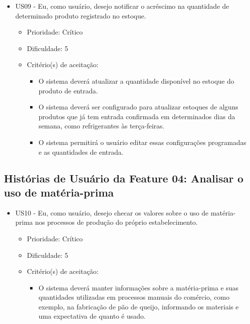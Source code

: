 \begin{itemize}

\item US09 - Eu, como usuário, desejo notificar o acréscimo na quantidade de determinado produto registrado no estoque.
    \begin{itemize}
    \item Prioridade: Crítico
    \item Dificuldade: 5
    \item Critério(s) de aceitação:
        \begin{itemize}
        \item O sistema deverá atualizar a quantidade disponível no estoque do produto de entrada.
        \item O sistema deverá ser configurado para atualizar estoques de alguns produtos que já tem entrada confirmada em determinados dias da semana, como refrigerantes às terça-feiras.
        \item O sistema permitirá o usuário editar essas configurações programadas e as quantidades de entrada.
        \end{itemize}
    \end{itemize}

\end{itemize}

\subsection{Histórias de Usuário da Feature 04: Analisar o uso de matéria-prima}

\begin{itemize}

\item US10 - Eu, como usuário, desejo checar os valores sobre o uso de matéria-prima nos processos de produção do próprio estabelecimento.
    \begin{itemize}
    \item Prioridade: Crítico
    \item Dificuldade: 5
    \item Critério(s) de aceitação:
    \begin{itemize}
    \item O sistema deverá manter informações sobre a matéria-prima e suas quantidades utilizadas em processos manuais do comércio, como exemplo, na fabricação de pão de queijo, informando os materiais e uma expectativa de quanto é usado.
    \end{itemize}
    \end{itemize}


\end{itemize}


